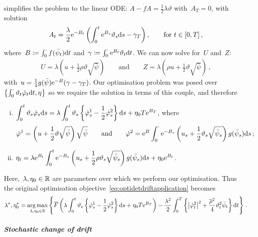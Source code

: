 simplifies the problem to the linear ODE:
$\dot{A}- \dot{f}A = \frac{1}{2}\lambda\vartheta$ with~$A_T = 0$,
with solution
\[
A_t = \frac{\lambda}{2} \mathrm{e}^{-B_t}\left( \int_0^t \mathrm{e}^{B_s} \vartheta_s \mathrm{d} s - \gamma_T \right),
\qquad \text{for } t\in[0,T]\,,
\]
where~$B\coloneqq\int_0^\cdot f(\bar\psi_t)\mathrm{d} t$ and~$\gamma \coloneqq \int_0^\cdot \mathrm{e}^{B_t}\vartheta_t \mathrm{d} t$. 
We can now solve for~$U$ and~$Z$:
\begin{align*}
U = \lambda\left( u + \frac{1}{2}\rho\vartheta\sqrt{\bar\psi} \right)
\qquad \text{and} \qquad
Z = \lambda\left ( \rho u + \frac{1}{2}\vartheta\sqrt{\bar\psi} \right)\,,
\end{align*}
with~$u = \frac{1}{4}g(\bar\psi)\mathrm{e}^{-B}(\gamma-\gamma_T)$. Our optimisation problem was posed over~$\left \{\int_0^\cdot \vartheta_t \dot{\varphi}_t \mathrm{d} t, \eta\right \}$ so we require the solution in terms of this couple, and therefore
\begin{enumerate}[(i)]
\item 
$\displaystyle
\int_0^t \vartheta_s \dot{\varphi}_s \mathrm{d} s = \lambda\int_0^t \vartheta_s \left \{ \dot{\varphi}^1_s - \frac{1}{2}\dot{\varphi}^2_s \right \}\mathrm{d} s + \eta_0 T \mathrm{e}^{B_T}$,
where
$$
\dot{\varphi}^1 = \left(u+ \frac{1}{2}\vartheta \sqrt{\bar\psi}\right)\sqrt{\bar\psi}
\qquad\text{and}\qquad
\dot{\varphi}^2 = \mathrm{e}^B \int_0^\cdot \mathrm{e}^{-B_s}\left( u_s + \frac{1}{2}\vartheta_s\sqrt{\bar\psi_s} \right )g(\bar\psi_s)\mathrm{d} s\,;
$$
\item 
$\displaystyle \eta_t = \lambda \mathrm{e}^{B_t} \int_0^t \mathrm{e}^{-B_s}\left( u_s + \frac{1}{2}\rho\vartheta_s\sqrt{\bar\psi_s} \right )g(\bar\psi_s)\mathrm{d} s + \eta_0 \mathrm{e}^{B_t}$.
\end{enumerate}
Here,~$\lambda,\eta_0\in\mathbb{R}$ are parameters over which we perform our optimisation. 
Thus the original optimisation objective~\eqref{eq:optidetdriftapplication} becomes 
\begin{align*}
\lambda^{*}, \eta_0^{*} = \operatorname*{arg\,max}_{\lambda,\eta_0\in\mathbb{R}}
\left\{\overline{F}\left( \lambda\int_0^t \vartheta_s \left \{ \dot{\varphi}^1_s - \frac{1}{2}\dot{\varphi}^2_s \right \}\mathrm{d} s + \eta_0 T \mathrm{e}^{B_T} \right ) - \frac{\lambda^2}{2}\int_0^T\left\{ \big| \dot{\varphi}^2_t \big|^2 + \frac{\overline{\rho}^2}{4}\vartheta_t^2\bar\psi_t \right\}\mathrm{d} t\right\}\,.
\end{align*}

\paragraph{\textit{Stochastic change of drift}}

